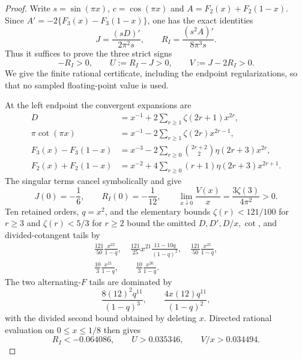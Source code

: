\documentclass[11pt]{amsart}
\numberwithin{equation}{section}
\theoremstyle{definition}
\theoremstyle{remark}
\begin{document}
\begin{proof}
Write $s=\sin(\pi x)$, $c=\cos(\pi x)$ and
$A=F_2(x)+F_2(1-x)$.  Since
$A'=-2\{F_3(x)-F_3(1-x)\}$, one has the exact identities
\begin{equation}\label{JC:eq:regular-ratio-derivative-identities}
 J=\frac{(sD)'}{2\pi^2s},\qquad
 R_I=\frac{(s^2A)'}{8\pi^3s}.
\end{equation}
Thus it suffices to prove the three strict signs
\[
 -R_I>0,\qquad U:=R_I-J>0,\qquad V:=J-2R_I>0.
\]
We give the finite rational certificate, including the endpoint
regularizations, so that no sampled floating-point value is used.

At the left endpoint the convergent expansions are
\begin{align*}
 D&=x^{-1}+2\sum_{r\ge1}\zeta(2r+1)x^{2r},\\
 \pi\cot(\pi x)&=x^{-1}-2\sum_{r\ge1}\zeta(2r)x^{2r-1},\\
 F_3(x)-F_3(1-x)
 &=x^{-3}-2\sum_{r\ge0}\binom{2r+2}{2}\eta(2r+3)x^{2r},\\
 F_2(x)+F_2(1-x)
 &=x^{-2}+4\sum_{r\ge0}(r+1)\eta(2r+3)x^{2r+1}.
\end{align*}
The singular terms cancel symbolically and give
\[
 J(0)=-\frac16,\qquad R_I(0)=-\frac1{12},\qquad
 \lim_{x\downarrow0}\frac{V(x)}x
 =\frac{3\zeta(3)}{4\pi^2}>0.
\]
Ten retained orders, $q=x^2$, and the elementary bounds
$\zeta(r)<121/100$ for $r\ge3$ and $\zeta(r)<5/3$ for $r\ge2$
bound the omitted $D,D',D/x,\cot$, and divided-cotangent tails by
\begin{gather*}
 \frac{121}{50}\frac{x^{22}}{1-q},\quad
 \frac{121}{25}x^{21}\frac{11-10q}{(1-q)^2},\quad
 \frac{121}{50}\frac{x^{21}}{1-q},\\
 \frac{10}{3}\frac{x^{21}}{1-q},\qquad
 \frac{10}{3}\frac{x^{20}}{1-q}.
\end{gather*}
The two alternating-$F$ tails are dominated by
\[
 \frac{8(12)^2q^{11}}{(1-q)^3},\qquad
 \frac{4x(12)q^{11}}{(1-q)^2},
\]
with the divided second bound obtained by deleting $x$.  Directed rational
evaluation on $0\le x\le1/8$ then gives
\begin{equation}\label{JC:eq:regular-ratio-left-certificate}
 R_I<-0.064086,\qquad U>0.035346,\qquad V/x>0.034494.
\end{equation}


\end{proof}
\end{document}
